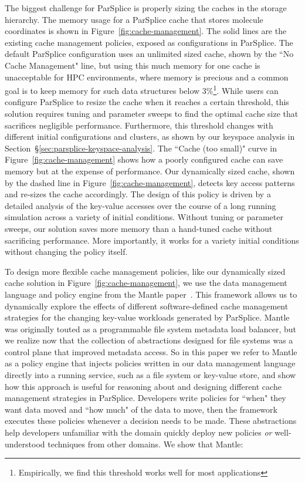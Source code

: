 The biggest challenge for ParSplice is properly sizing the caches in the
storage hierarchy.  The memory usage for a ParSplice cache that stores molecule
coordinates is shown in Figure~\ref{fig:cache-management}. The solid lines are
the existing cache management policies, exposed as configurations in ParSplice.
The default ParSplice configuration uses an unlimited sized cache, shown by the
``No Cache Management" line, but using this much memory for one cache is
unacceptable for HPC environments, where memory is precious and a common goal
is to keep memory for such data structures below 3\%\footnote{Empirically, we
find this threshold works well for most applications}.  While users can
configure ParSplice to resize the cache when it reaches a certain threshold,
this solution requires tuning and parameter sweeps to find the optimal cache
size that sacrifices negligible performance.  Furthermore, this threshold
changes with different initial configurations and clusters, as shown by our
keyspace analysis in Section~\S\ref{sec:parsplice-keyspace-analysis}.  The
``Cache (too small)" curve in Figure~\ref{fig:cache-management} shows how a
poorly configured cache can save memory but at the expense of performance.  Our
dynamically sized cache, shown by the dashed line in
Figure~\ref{fig:cache-management}, detects key access patterns and
re-sizes the cache accordingly. The design of this policy is driven by a
detailed analysis of the key-value accesses over the course of a long running
simulation across a variety of initial conditions.  Without tuning or parameter
sweeps, our solution saves more memory than a hand-tuned cache without
sacrificing performance.  More importantly, it works for a variety initial
conditions without changing the policy itself.

To design more flexible cache management policies, like our dynamically sized
cache solution in Figure~\ref{fig:cache-management}, we use the data management
language and policy engine from the Mantle paper~\cite{sevilla:sc15-mantle}.
This framework allows us to dynamically explore the effects of different
software-defined cache management strategies for the changing key-value
workloads generated by ParSplice.  Mantle was originally touted as a
programmable file system metadata load balancer, but we realize now that the
collection of abstractions designed for file systems was a control plane that
improved metadata access. So in this paper we refer to Mantle as a policy
engine that injects policies written in our data management language directly
into a running service, such as a file system or key-value store, and show how
this approach is useful for reasoning about and designing different cache
management strategies in ParSplice.  Developers write policies for ``when" they
want data moved and ``how much" of the data to move, then the framework
executes these policies whenever a decision needs to be made.  These
abstractions help developers unfamiliar with the domain quickly deploy new
policies {\it or} well-understood techniques from other domains.  We show that
Mantle:


